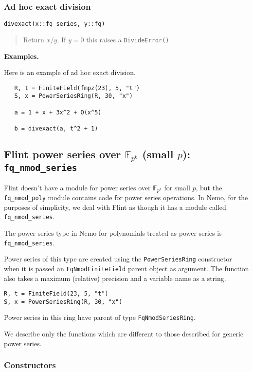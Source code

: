 \documentclass[a4paper,10pt]{article}
\newcommand{\F}{\mathbb{F}}
\newcommand{\code}{\lstinline}
\newcommand{\desc}[1]{\vspace{-3mm}\begin{quote}#1\end{quote}}
\begin{document}
{{\subsubsection{Ad hoc exact division}

\begin{lstlisting}
divexact(x::fq_series, y::fq)
\end{lstlisting}

\desc{Return $x/y$. If $y = 0$ this raises a \code{DivideError()}.}

\textbf{Examples.}

Here is an example of ad hoc exact division.

\begin{lstlisting}
   R, t = FiniteField(fmpz(23), 5, "t")
   S, x = PowerSeriesRing(R, 30, "x")

   a = 1 + x + 3x^2 + O(x^5)
   
   b = divexact(a, t^2 + 1)
\end{lstlisting}

\subsection{Flint power series over $\F_{p^k}$ (small $p$): \code{fq_nmod_series}}

Flint doesn't have a module for power series over $\F_{p^k}$ for small $p$, but the
\code{fq_nmod_poly} module contains code for power series operations. In Nemo, for the
purposes of simplicity, we deal with Flint as though it has a module called
\code{fq_nmod_series}.

The power series type in Nemo for polynomials treated as power series is
\code{fq_nmod_series}. 

Power series of this type are created using the \code{PowerSeriesRing} constructor when
it is passed an \code{FqNmodFiniteField} parent object as argument. The function also
takes a maximum (relative) precision and a variable name as a string.

\begin{lstlisting}
R, t = FiniteField(23, 5, "t")
S, x = PowerSeriesRing(R, 30, "x")
\end{lstlisting}

Power series in this ring have parent of type \code{FqNmodSeriesRing}.

We describe only the functions which are different to those described for generic
power series.

\subsubsection{Constructors}

}}
\end{document}
